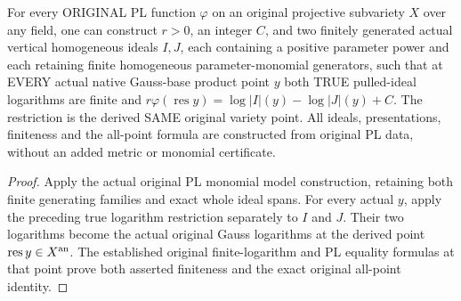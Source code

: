 \begin{theorem}
\label{local:actual-pl-all-product-point-monomial-models}
\leanok
{}
For every ORIGINAL PL function $\varphi$ on an original projective
subvariety $X$ over any field, one can construct $r>0$, an integer $C$,
and two finitely generated actual vertical homogeneous ideals $I,J$,
each containing a positive parameter power and each retaining finite
homogeneous parameter-monomial generators, such that at EVERY actual
native Gauss-base product point $y$ both TRUE pulled-ideal logarithms
are finite and
$r\varphi(\operatorname{res}y)=\log|I|(y)-\log|J|(y)+C$.
The restriction is the derived SAME original variety point. All ideals,
presentations, finiteness and the all-point formula are constructed from
original PL data, without an added metric or monomial certificate.
\end{theorem}
\begin{proof}
Apply the actual original PL monomial model construction, retaining both
finite generating families and exact whole ideal spans. For every actual
$y$, apply the preceding true logarithm restriction separately to $I$
and $J$. Their two logarithms become the actual original Gauss logarithms
at the derived point $\operatorname{res}y\in X^{\rm an}$. The established
original finite-logarithm and PL equality formulas at that point prove
both asserted finiteness and the exact original all-point identity.
\end{proof}
